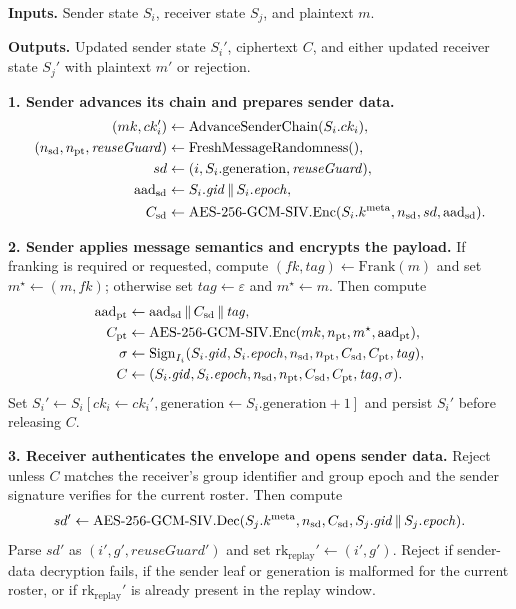 \documentclass[preprint,12pt]{elsarticle}
\theoremstyle{definition}
\newcommand{\tech}[1]{\textnormal{#1}}
\renewcommand{\mathsf}[1]{\mathrm{#1}}
\newcommand{\AEAD}{\tech{AES-256-GCM-SIV}}
\newcommand{\Enc}{\tech{Enc}}
\newcommand{\Dec}{\tech{Dec}}
\newcommand{\concat}{\,\|\,}
\newcommand{\gid}{\mathit{gid}}
\newcommand{\epoch}{\mathit{epoch}}
\begin{document}
\begingroup
\LinesNotNumbered
\SetAlgoNoLine
\begin{algorithm}[!tbp]
\caption{Encrypt and decrypt a group-epoch application message.}\label{alg:message}
\footnotesize
\textbf{Inputs.}
Sender state $S_i$, receiver state $S_j$, and plaintext $m$.

\textbf{Outputs.}
Updated sender state $S_i'$, ciphertext $C$, and either updated receiver state
$S_j'$ with plaintext $m'$ or rejection.
\vspace{0.25\baselineskip}

\textbf{1. Sender advances its chain and prepares sender data.}
\[
\begin{aligned}
(mk,ck_i')&\gets \mathrm{AdvanceSenderChain}(S_i.ck_i),\\
(n_{\mathsf{sd}},n_{\mathsf{pt}},\mathit{reuseGuard})
  &\gets \mathrm{FreshMessageRandomness}(),\\
sd&\gets (i,S_i.\mathrm{generation},\mathit{reuseGuard}),\\
\mathsf{aad}_{\mathsf{sd}}&\gets S_i.\gid\concat S_i.\epoch,\\
C_{\mathsf{sd}}&\gets
  \AEAD.\Enc(S_i.k^{\mathsf{meta}},n_{\mathsf{sd}},sd,\mathsf{aad}_{\mathsf{sd}}).
\end{aligned}
\]

\textbf{2. Sender applies message semantics and encrypts the payload.}
If franking is required or requested, compute $(fk,\mathit{tag})\gets
\mathrm{Frank}(m)$ and set $m^\star\gets(m,fk)$; otherwise set
$\mathit{tag}\gets\varepsilon$ and $m^\star\gets m$. Then compute
\[
\begin{aligned}
\mathsf{aad}_{\mathsf{pt}}&\gets
  \mathsf{aad}_{\mathsf{sd}}\concat C_{\mathsf{sd}}\concat \mathit{tag},\\
C_{\mathsf{pt}}&\gets
  \AEAD.\Enc(mk,n_{\mathsf{pt}},m^\star,\mathsf{aad}_{\mathsf{pt}}),\\
\sigma&\gets \mathrm{Sign}_{I_i}(S_i.\gid,S_i.\epoch,n_{\mathsf{sd}},
  n_{\mathsf{pt}},C_{\mathsf{sd}},C_{\mathsf{pt}},\mathit{tag}),\\
C&\gets (S_i.\gid,S_i.\epoch,n_{\mathsf{sd}},n_{\mathsf{pt}},
  C_{\mathsf{sd}},C_{\mathsf{pt}},\mathit{tag},\sigma).
\end{aligned}
\]
Set $S_i'\gets S_i[ck_i\leftarrow ck_i',
\mathrm{generation}\leftarrow S_i.\mathrm{generation}+1]$ and persist $S_i'$
before releasing $C$.

\textbf{3. Receiver authenticates the envelope and opens sender data.}
Reject unless $C$ matches the receiver's group identifier and group epoch and
the sender signature verifies for the current roster. Then compute
\[
sd'\gets
  \AEAD.\Dec(S_j.k^{\mathsf{meta}},n_{\mathsf{sd}},C_{\mathsf{sd}},
    S_j.\gid\concat S_j.\epoch).
\]
Parse $sd'$ as $(i',g',\mathit{reuseGuard}')$ and set
$\mathsf{rk}_{\mathsf{replay}}'\gets(i',g')$. Reject if sender-data decryption
fails, if the sender leaf or generation is malformed for the current roster, or
if $\mathsf{rk}_{\mathsf{replay}}'$ is already present in the replay window.


\end{algorithm}
\end{document}
